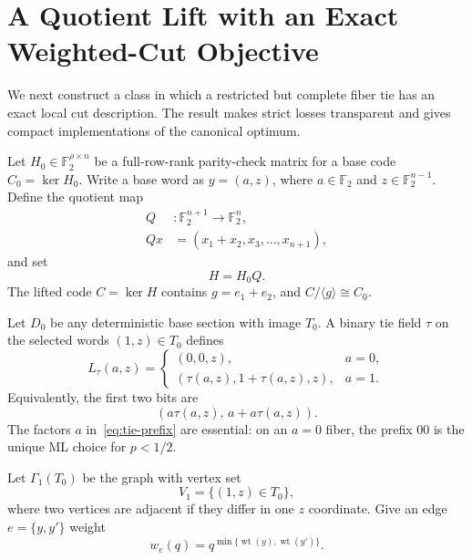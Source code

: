 \documentclass[journal]{IEEEtran}
\theoremstyle{definition}
\theoremstyle{remark}
\newcommand{\F}{\mathbb F}
\newcommand{\wt}{\operatorname{wt}}
\begin{document}
\section{A Quotient Lift with an Exact Weighted-Cut Objective}
\label{sec:lift}

We next construct a class in which a restricted but complete fiber tie has an
exact local cut description.  The result makes strict losses transparent and
gives compact implementations of the canonical optimum.

Let $H_0\in\F_2^{\rho\times n}$ be a full-row-rank parity-check matrix for a
base code $C_0=\ker H_0$.  Write a base word as $y=(a,z)$, where
$a\in\F_2$ and $z\in\F_2^{n-1}$.  Define the quotient map
\begin{equation}
 \begin{aligned}
 Q&:\F_2^{n+1}\longrightarrow\F_2^n,\\
 Qx&=(x_1+x_2,x_3,\ldots,x_{n+1}),
 \end{aligned}
 \label{eq:Q}
\end{equation}
and set
\begin{equation}
 H=H_0Q.
 \label{eq:lift-H}
\end{equation}
The lifted code $C=\ker H$ contains $g=e_1+e_2$, and
$C/\langle g\rangle\cong C_0$.

Let $D_0$ be any deterministic base section with image $T_0$.  A binary tie
field $\tau$ on the selected words $(1,z)\in T_0$ defines
\begin{equation}
 L_\tau(a,z)=
 \begin{cases}
  (0,0,z),&a=0,\\
  (\tau(a,z),1+\tau(a,z),z),&a=1.
 \end{cases}
 \label{eq:tie-lift}
\end{equation}
Equivalently, the first two bits are
\begin{equation}
 (a\tau(a,z),\,a+a\tau(a,z)).
 \label{eq:tie-prefix}
\end{equation}
The factors $a$ in~\eqref{eq:tie-prefix} are essential: on an $a=0$ fiber,
the prefix $00$ is the unique ML choice for $p<1/2$.

Let $\Gamma_1(T_0)$ be the graph with vertex set
\begin{equation}
 V_1=\{(1,z)\in T_0\},
\end{equation}
where two vertices are adjacent if they differ in one $z$ coordinate.  Give an
edge $e=\{y,y'\}$ weight
\begin{equation}
 w_e(q)=q^{\min\{\wt(y),\wt(y')\}}.
 \label{eq:cut-weight}
\end{equation}
\end{document}
